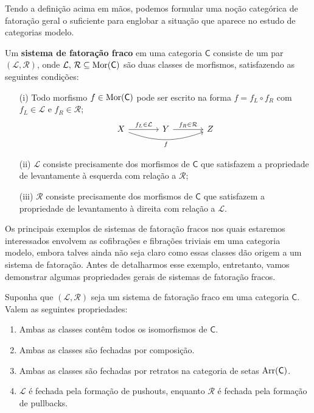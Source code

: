 Tendo a definição acima em mãos, podemos formular uma noção categórica de fatoração geral o suficiente para englobar a situação que aparece no estudo de categorias modelo.

\begin{defin}
  Um \textbf{sistema de fatoração fraco} em uma categoria $\mathsf{C}$ consiste de um par $(\mathcal{L},\mathcal{R})$, onde $\mathcal{L},\, \mathcal{R} \subseteq \mathrm{Mor}(\mathsf{C})$ são duas classes de morfismos, satisfazendo as seguintes condições:
  \begin{enumerate}
  \item[(i)] Todo morfismo $f \in \mathrm{Mor}(\mathsf{C})$ pode ser escrito na forma $f = f_{L} \circ f_{R}$ com $f_{L} \in \mathcal{L}$ e $f_{R} \in \mathcal{R}$;
    \begin{displaymath}
      \begin{tikzcd}[column sep=1.25cm]
        X
        \arrow[r, "f_{L} \in \mathcal{L}"]
        \arrow[rr, bend right=20, "f" swap]
        & Y
        \arrow[r, "f_{R} \in \mathcal{R}"]
        & Z
      \end{tikzcd}
    \end{displaymath}
    
  \item[(ii)] $\mathcal{L}$ consiste precisamente dos morfismos de $\mathsf{C}$ que satisfazem a propriedade de levantamente à esquerda com relação a $\mathcal{R}$;
    
  \item[(iii)] $\mathcal{R}$ consiste precisamente dos morfismos de $\mathsf{C}$ que satisfazem a propriedade de levantamento à direita com relação a $\mathcal{L}$.
  \end{enumerate}
\end{defin}

Os principais exemplos de sistemas de fatoração fracos nos quais estaremos interessados envolvem as cofibrações e fibrações triviais em uma categoria modelo, embora talves ainda não seja claro como essas classes dão origem a um sistema de fatoração.
Antes de detalharmos esse exemplo, entretanto, vamos demonstrar algumas propriedades gerais de sistemas de fatoração fracos.

\begin{prop}
  Suponha que $(\mathcal{L},\mathcal{R})$ seja um sistema de fatoração fraco em uma categoria $\mathsf{C}$.
  Valem as seguintes propriedades:
  \begin{enumerate}
  \item Ambas as classes contêm todos os isomorfismos de $\mathsf{C}$.
    
  \item Ambas as classes são fechadas por composição.
    
  \item Ambas as classes são fechadas por retratos na categoria de setas $\mathrm{Arr}(\mathsf{C})$.
    
  \item $\mathcal{L}$ é fechada pela formação de pushouts, enquanto $\mathcal{R}$ é fechada pela formação de pullbacks.
  \end{enumerate}
\end{prop}

